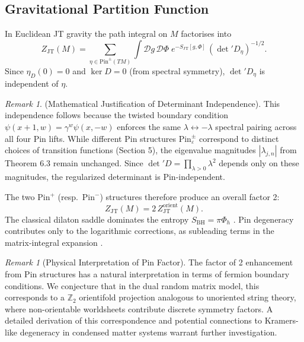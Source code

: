 \documentclass[11pt]{amsart}
\theoremstyle{definition}
\theoremstyle{remark}
\newtheorem{remark}[theorem]{Remark}
\begin{document}
\subsection{Gravitational Partition Function}

In Euclidean JT gravity the path integral on $M$ factorises into
\[
Z_{\text{JT}}(M)=
\sum_{\eta\in\mathrm{Pin}^{\pm}(TM)}
\int\!\!\mathcal{D}g\,\mathcal{D}\Phi\;
e^{-S_{\text{JT}}[g,\Phi]}\,
(\det{}'D_{\eta})^{-1/2}.
\]
Since $\eta_D(0)=0$ and $\ker D = 0$ (from spectral symmetry), $\det{}'D_{\eta}$ is independent of $\eta$.  

\begin{remark}

 (Mathematical Justification of Determinant Independence). 
This independence follows because the twisted boundary condition 
$\psi(x+1,w) = \gamma^w\psi(x,-w)$ enforces the same $\lambda \leftrightarrow -\lambda$ 
spectral pairing across all four Pin lifts. While different Pin structures 
$\text{Pin}^{\pm}_{\varepsilon}$ correspond to distinct choices of transition functions 
(Section 5), the eigenvalue magnitudes $|\lambda_{j,n}|$ from Theorem 6.3 remain unchanged. 
Since $\det' D = \prod_{\lambda>0} \lambda^2$ depends only on these magnitudes, 
the regularized determinant is Pin-independent.
   
\end{remark}

The two Pin$^{+}$ (resp.\ Pin$^{-}$) structures therefore produce an overall factor 2:
\[
Z_{\text{JT}}(M)=2\,Z_{\text{JT}}^{\text{orient}}(M).
\]
The classical dilaton saddle dominates the entropy $S_{\text{BH}}=\pi\Phi_h$ \cite{StanfordWitten}.  Pin degeneracy contributes only to the logarithmic corrections, as subleading terms in the matrix-integral expansion \cite{SaadShenkerStanford}.

\begin{remark}[Physical Interpretation of Pin Factor]
The factor of 2 enhancement from Pin structures has a natural interpretation in terms of fermion boundary conditions. We conjecture that in the dual random matrix model, this corresponds to a $\mathbb{Z}_2$ orientifold projection analogous to unoriented string theory, where non-orientable worldsheets contribute discrete symmetry factors. A detailed derivation of this correspondence and potential connections to Kramers-like degeneracy in condensed matter systems warrant further investigation.
\end{remark}
\end{document}
